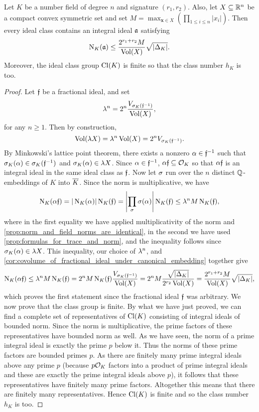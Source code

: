     \begin{theorem}\label{equ:finitness_of_class_number}
      Let $K$ be a number field of degree $n$ and signature $(r_{1},r_{2})$. Also, let $X \subseteq \mathbb{R}^{n}$ be a compact convex symmetric set and set $M = \max_{\mathbf{x} \in X}\left(\prod_{1 \le i \le n}|x_{i}|\right)$. Then every ideal class contains an integral ideal $\mathfrak{a}$ satisfying
      \[
        \operatorname{\mathrm{N}}_{K}(\mathfrak{a}) \le \frac{2^{r_{1}+r_{2}}M}{\operatorname{\mathrm{Vol}}(X)}\sqrt{|\Delta_{K}|}.
      \]
      Moreover, the ideal class group $\operatorname{\mathrm{Cl}}(K)$ is finite so that the class number $h_{K}$ is too.
    \end{theorem}
    \begin{proof}
      Let $\mathfrak{f}$ be a fractional ideal, and set
      \[
        \lambda^{n} = 2^{n}\frac{V_{\sigma_{K}(\mathfrak{f}^{-1})}}{\operatorname{\mathrm{Vol}}(X)},
      \]
      for any $n \ge 1$. Then by construction,
      \[
        \operatorname{\mathrm{Vol}}(\lambda X) = \lambda^{n}\operatorname{\mathrm{Vol}}(X) = 2^{n}V_{\sigma_{K}(\mathfrak{f}^{-1})}.
      \]
      By Minkowski's lattice point theorem, there exists a nonzero $\alpha \in \mathfrak{f}^{-1}$ such that $\sigma_{K}(\alpha) \in \sigma_{K}(\mathfrak{f}^{-1})$ and $\sigma_{K}(\alpha) \in \lambda X$. Since $\alpha \in \mathfrak{f}^{-1}$, $\alpha\mathfrak{f} \subseteq \mathcal{O}_{K}$ so that $\alpha\mathfrak{f}$ is an integral ideal in the same ideal class as $\mathfrak{f}$. Now let $\sigma$ run over the $n$ distinct $\mathbb{Q}$-embeddings of $K$ into $\overline{K}$. Since the norm is multiplicative, we have
      \[
        \operatorname{\mathrm{N}}_{K}(\alpha\mathfrak{f}) = |\operatorname{\mathrm{N}}_{K}(\alpha)|\operatorname{\mathrm{N}}_{K}(\mathfrak{f}) = \left|\prod_{\sigma}\sigma(\alpha)\right|\operatorname{\mathrm{N}}_{K}(\mathfrak{f}) \le \lambda^{n}M\operatorname{\mathrm{N}}_{K}(\mathfrak{f}),
      \]
      where in the first equality we have applied multiplicativity of the norm and \cref{prop:norm_and_field_norms_are_identical}, in the second we have used \cref{prop:formulas_for_trace_and_norm}, and the inequality follows since $\sigma_{K}(\alpha) \in \lambda X$. This inequality, our choice of $\lambda^{n}$, and \cref{cor:covolume_of_fractional_ideal_under_canonical_embedding} together give
      \[
        \operatorname{\mathrm{N}}_{K}(\alpha\mathfrak{f}) \le \lambda^{n}M\operatorname{\mathrm{N}}_{K}(\mathfrak{f}) = 2^{n}M\operatorname{\mathrm{N}}_{K}(\mathfrak{f})\frac{V_{\sigma_{K}(\mathfrak{f}^{-1})}}{\operatorname{\mathrm{Vol}}(X)} = 2^{n}M\frac{\sqrt{|\Delta_{K}|}}{2^{r_{2}}\operatorname{\mathrm{Vol}}(X)} = \frac{2^{r_{1}+r_{2}}M}{\operatorname{\mathrm{Vol}}(X)}\sqrt{|\Delta_{K}|},
      \]
      which proves the first statement since the fractional ideal $\mathfrak{f}$ was arbitrary. We now prove that the class group is finite. By what we have just proved, we can find a complete set of representatives of $\operatorname{\mathrm{Cl}}(K)$ consisting of integral ideals of bounded norm. Since the norm is multiplicative, the prime factors of these representatives have bounded norm as well. As we have seen, the norm of a prime integral ideal is exactly the prime $p$ below it. Thus the norms of these prime factors are bounded primes $p$. As there are finitely many prime integral ideals above any prime $p$ (because $p\mathcal{O}_{K}$ factors into a product of prime integral ideals and these are exactly the prime integral ideals above $p$), it follows that these representatives have finitely many prime factors. Altogether this means that there are finitely many representatives. Hence $\operatorname{\mathrm{Cl}}(K)$ is finite and so the class number $h_{K}$ is too.
    \end{proof}


